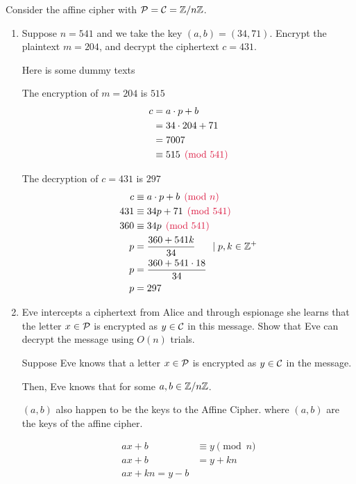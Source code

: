 \begin{problem}
Consider the affine cipher with $\mathcal{P}=\mathcal{C}=\mathbb{Z}/n\mathbb{Z}$.  
\begin{enumerate}\renewcommand{\itemsep}{3mm}
\item Suppose $n=541$ and we take the key $(a,b)=(34,71)$.  Encrypt the plaintext $m=204$, and decrypt the ciphertext $c=431$.
\begin{Answer}

  Here is some dummy texts

\noindent
The encryption of $m=204$ is $515$
\begin{align*}
  c &= a \cdot p + b\\
  &= 34 \cdot 204 + 71\\
  &= 7007\\
  &\equiv 515 \crim{\pmod{541}}
\end{align*}

\noindent
The decryption of $c=431$ is $297$
\begin{align*}
  c &\equiv a \cdot p + b \crim{\pmod n}\\
  431 &\equiv 34p + 71 \crim{\pmod{541}}\\
  360 &\equiv 34p \crim{\pmod{541}}\\
  p &= \frac{360 + 541k}{34}  \hspace{15pt}\mid p,k \in \Z^+\\
  p &= \frac{360 + 541\cdot 18}{34}\\
  p &= 297
\end{align*}

\end{Answer}

\item Eve intercepts a ciphertext from Alice
and through espionage she learns that the letter
$x \in \mathcal{P}$ is encrypted as $y \in \mathcal{C}$ in this message.
Show that Eve can decrypt the message using $O(n)$ trials.  
\begin{Answer}

Suppose Eve knows that a letter $x \in \mathcal{P}$ is encrypted as
$y \in \mathcal{C}$ in the message.

\noindent
Then, Eve knows that  for some $a, b \in \mathbb{Z}/n\mathbb{Z}$.

\noindent $(a, b)$ also happen to be the keys to the Affine Cipher.
where $(a, b)$ are the keys of the affine cipher.

\begin{align*}
  ax + b &\equiv y \pmod n\\
  ax + b &= y + kn\\
  ax + kn = y - b\\
\end{align*}


\end{Answer}
\end{enumerate}
\end{problem}
